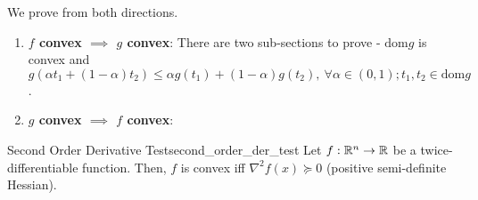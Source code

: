 \begin{proof*}
	We prove from both directions.
	\begin{enumerate}[label=(\roman*)]
		\item \textbf{$f$ convex $\implies$ $g$ convex}: There are two sub-sections to prove - $\mathrm{dom}g$ is convex and $g(\alpha t_1 + (1-\alpha)t_2)\le \alpha g(t_1) + (1-\alpha)g(t_2), \ \forall \alpha\in(0,1); t_1, t_2\in \mathrm{dom}g$.	
		\item \textbf{$g$ convex $\implies$ $f$ convex}:
	\end{enumerate} 	
\end{proof*} 

\begin{proposition}{Second Order Derivative Test}{second_order_der_test}
	Let $f:\mathbb{R}^n\to\mathbb{R}$ be a twice-differentiable function. Then, $f$ is convex iff $\nabla^2 f(x)\succeq	0$ (positive semi-definite Hessian).
\end{proposition} 

